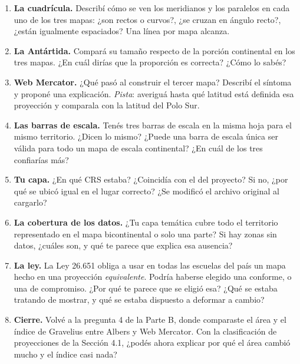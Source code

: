 \documentclass{article}
\begin{document}
\begin{enumerate}
    \item \textbf{La cuadrícula.} Describí cómo se ven los meridianos y los paralelos en cada uno de los tres mapas: ¿son rectos o curvos?, ¿se cruzan en ángulo recto?, ¿están igualmente espaciados? Una línea por mapa alcanza.

    \item \textbf{La Antártida.} Compará su tamaño respecto de la porción continental en los tres mapas. ¿En cuál dirías que la proporción es correcta? ¿Cómo lo sabés?

    \item \textbf{Web Mercator.} ¿Qué pasó al construir el tercer mapa? Describí el síntoma y proponé una explicación. \textit{Pista}: averiguá hasta qué latitud está definida esa proyección y comparala con la latitud del Polo Sur.

    \item \textbf{Las barras de escala.} Tenés tres barras de escala en la misma hoja para el mismo territorio. ¿Dicen lo mismo? ¿Puede una barra de escala única ser válida para todo un mapa de escala continental? ¿En cuál de los tres confiarías más?

    \item \textbf{Tu capa.} ¿En qué CRS estaba? ¿Coincidía con el del proyecto? Si no, ¿por qué se ubicó igual en el lugar correcto? ¿Se modificó el archivo original al cargarlo?

    \item \textbf{La cobertura de los datos.} ¿Tu capa temática cubre todo el territorio representado en el mapa bicontinental o solo una parte? Si hay zonas sin datos, ¿cuáles son, y qué te parece que explica esa ausencia?

    \item \textbf{La ley.} La Ley 26.651 obliga a usar en todas las escuelas del país un mapa hecho en una proyección \emph{equivalente}. Podría haberse elegido una conforme, o una de compromiso. ¿Por qué te parece que se eligió esa? ¿Qué se estaba tratando de mostrar, y qué se estaba dispuesto a deformar a cambio?

    \item \textbf{Cierre.} Volvé a la pregunta 4 de la Parte B, donde comparaste el área y el índice de Gravelius entre Albers y Web Mercator. Con la clasificación de proyecciones de la Sección 4.1, ¿podés ahora explicar por qué el área cambió mucho y el índice casi nada?
\end{enumerate}
\end{document}
